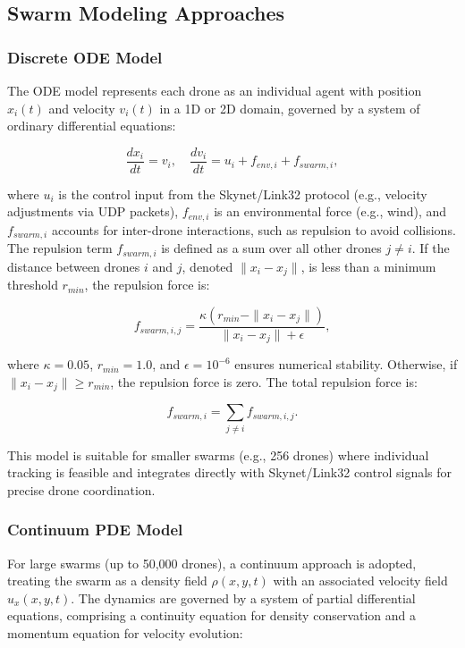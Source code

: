 \documentclass{article}
\theoremstyle{plain}
\begin{document}
\subsection{Swarm Modeling Approaches}

\subsubsection{Discrete ODE Model}
The ODE model represents each drone as an individual agent with
position $x_i(t)$ and velocity $v_i(t)$ in a 1D or 2D domain,
governed by a system of ordinary differential equations:

$$
  \frac{d x_i}{dt} = v_i, \quad \frac{d v_i}{dt} = u_i + f_{env,i} + f_{swarm,i},
$$

where $u_i$ is the control input from the Skynet/Link32 protocol
(e.g., velocity adjustments via UDP packets), $f_{env,i}$ is an
environmental force (e.g., wind), and $f_{swarm,i}$ accounts for
inter-drone interactions, such as repulsion to avoid collisions.
The repulsion term $f_{swarm,i}$ is defined as a sum over all other
drones $j \neq i$. If the distance between drones $i$ and $j$,
denoted $\|x_i - x_j\|$, is less than a minimum threshold $r_{min}$,
the repulsion force is:

$$
  f_{swarm,i,j} = \frac{\kappa (r_{min} - \|x_i - x_j\|)}{\|x_i - x_j\| + \epsilon},
$$

where $\kappa = 0.05$, $r_{min} = 1.0$, and $\epsilon = 10^{-6}$ ensures numerical stability.
Otherwise, if $\|x_i - x_j\| \geq r_{min}$, the repulsion force is zero.
The total repulsion force is:

$$
  f_{swarm,i} = \sum_{j \neq i} f_{swarm,i,j}.
$$

This model is suitable for smaller swarms (e.g., 256 drones) where
individual tracking is feasible and integrates directly with
Skynet/Link32 control signals for precise drone coordination.

\subsubsection{Continuum PDE Model}
For large swarms (up to 50,000 drones), a continuum approach is adopted,
treating the swarm as a density field $\rho(x, y, t)$ with an associated
velocity field $u_x(x, y, t)$. The dynamics are governed by a system of
partial differential equations, comprising a continuity equation for density
conservation and a momentum equation for velocity evolution:
\end{document}
